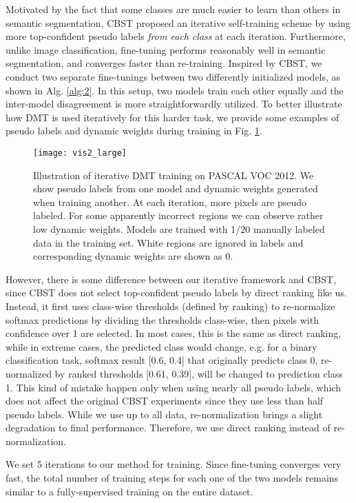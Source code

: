 \documentclass[preprint,review,10pt]{elsarticle}
\begin{document}
Motivated by the fact that some classes are much easier to learn than others in semantic segmentation, CBST \cite{cbst} proposed an iterative self-training scheme by using more top-confident pseudo labels \textit{from each class} at each iteration. Furthermore, unlike image classification, fine-tuning performs reasonably well in semantic segmentation, and converges faster than re-training. Inspired by CBST, we conduct two separate fine-tunings between two differently initialized models, as shown in Alg. \ref{alg:2}. In this setup, two models train each other equally and the inter-model disagreement is more straightforwardly utilized. To better illustrate how DMT is used iteratively for this harder task, we provide some examples of pseudo labels and dynamic weights during training in Fig. \ref{fig12}.

\begin{figure}[t]
\centering
\texttt{[image: vis2\_large]}
\caption{Illustration of iterative DMT training on PASCAL VOC 2012. We show pseudo labels from one model and dynamic weights generated when training another. At each iteration, more pixels are pseudo labeled. For some apparently incorrect regions we can observe rather low dynamic weights. Models are trained with 1/20 manually labeled data in the training set. White regions are ignored in labels and corresponding dynamic weights are shown as 0. }
\label{fig12}
\end{figure}

However, there is some difference between our iterative framework and CBST, since CBST does not select top-confident pseudo labels by direct ranking like us. Instead, it first uses class-wise thresholds (defined by ranking) to re-normalize softmax predictions by dividing the thresholds class-wise, then pixels with confidence over 1 are selected. In most cases, this is the same as direct ranking, while in extreme cases, the predicted class would change, e.g. for a binary classification task, softmax result [0.6, 0.4] that originally predicts class 0, re-normalized by ranked thresholds [0.61, 0.39], will be changed to prediction class 1. This kind of mistake happen only when using nearly all pseudo labels, which does not affect the original CBST experiments since they use less than half pseudo labels. While we use up to all data, re-normalization brings a slight degradation to final performance. Therefore, we use direct ranking instead of re-normalization.

We set 5 iterations to our method for training. Since fine-tuning converges very fast, the total number of training steps for each one of the two models remains similar to a fully-supervised training on the entire dataset.
\end{document}
